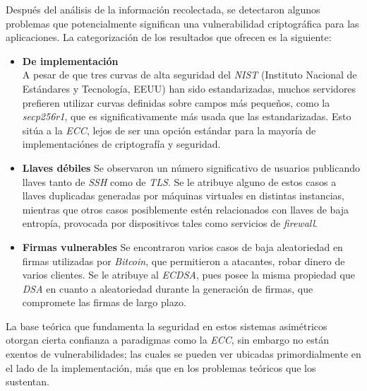 \documentclass[14pt]{article}
\begin{document}
Después del análisis de la información recolectada, se detectaron algunos problemas que
potencialmente significan una vulnerabilidad criptográfica para las aplicaciones.
La categorización de los resultados que ofrecen es la siguiente:
\begin{itemize}
\item \textbf{De implementación}\\
  A pesar de que tres curvas de alta seguridad del \textit{NIST} (Instituto Nacional de Estándares y Tecnología, EEUU) han sido estandarizadas, muchos servidores prefieren utilizar curvas definidas sobre campos más pequeños, como la \textit{secp256r1}, que es significativamente más usada que las estandarizadas. Esto sitúa a la \textit{ECC}, lejos de ser una opción estándar para la mayoría de implementaciónes de criptografía y seguridad.
\item \textbf{Llaves débiles}
  Se observaron un número significativo de usuarios publicando llaves tanto de \textit{SSH} como de \textit{TLS}. Se le atribuye alguno de estos casos a llaves duplicadas generadas por máquinas virtuales en distintas instancias, mientras que otros casos posiblemente estén relacionados con llaves de baja entropía, provocada por dispositivos tales como servicios de \textit{firewall}.
\item \textbf{Firmas vulnerables}
  Se encontraron varios casos de baja aleatoriedad en firmas utilizadas por \textit{Bitcoin}, que permitieron a atacantes, robar dinero de varios clientes. Se le atribuye al \textit{ECDSA}, pues posee la misma propiedad que \textit{DSA} en cuanto a aleatoriedad durante la generación de firmas, que compromete las firmas de largo plazo.
\end{itemize}

La base teórica que fundamenta la seguridad en estos sistemas asimétricos otorgan cierta confianza a paradigmas como  la \textit{ECC}, sin embargo no están exentos de vulnerabilidades; las cuales se pueden ver ubicadas primordialmente en el lado de la implementación, más que en los problemas teóricos que los sustentan.  
\end{document}
